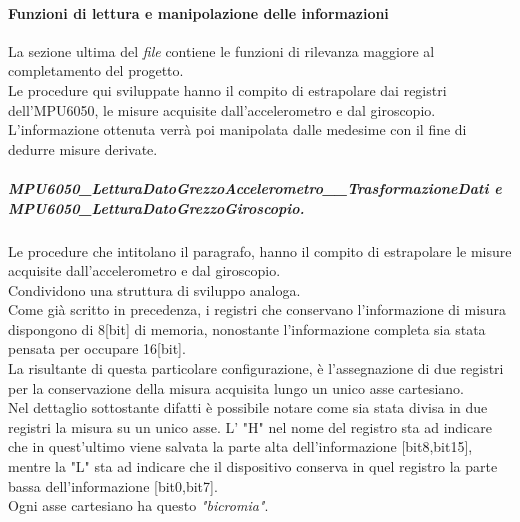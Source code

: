 \paragraph{Funzioni di lettura e manipolazione delle informazioni}
La sezione ultima del \textit{file} contiene le funzioni di rilevanza maggiore al completamento del progetto.\\
Le procedure qui sviluppate hanno il compito di estrapolare dai registri dell'MPU6050, le misure acquisite dall'accelerometro e dal giroscopio. L'informazione ottenuta verrà poi manipolata dalle medesime con il fine di dedurre misure derivate.
\subparagraph{MPU6050\_LetturaDatoGrezzoAccelerometro\_\_TrasformazioneDati e\\ MPU6050\_LetturaDatoGrezzoGiroscopio.}
Le procedure che intitolano il paragrafo, hanno il compito di estrapolare le misure acquisite dall'accelerometro e dal giroscopio.\\Condividono una struttura di sviluppo analoga.\\
Come già scritto in precedenza, i registri che conservano l'informazione di misura dispongono di 8[bit] di memoria, nonostante l'informazione completa sia stata pensata per occupare 16[bit].\\
La risultante di questa particolare configurazione, è l'assegnazione di due registri per la conservazione della misura acquisita lungo un unico asse cartesiano.\\
Nel dettaglio sottostante difatti è possibile notare come sia stata divisa in due registri la misura su un unico asse.
L' "H" nel nome del registro sta ad indicare che in quest'ultimo viene salvata la parte alta dell'informazione [bit8,bit15], mentre la "L" sta ad indicare che il dispositivo conserva in quel registro la parte bassa dell'informazione [bit0,bit7].\\
Ogni asse cartesiano ha questo \textit{"bicromia"}.
\begin{table}[H]
    \centering
    \caption{Dettaglio sull'adiacenza dei registri contenenti l'informazione}
    \label{tab: tabella}
\end{table}
